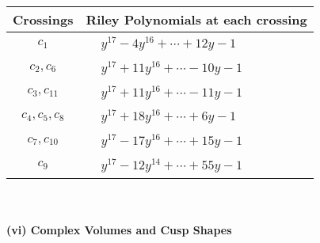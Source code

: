 \documentclass[1p]{elsarticle_modified}
\theoremstyle{definition}
\begin{document}
\begin{tabular}{m{50pt}|m{274pt}}
Crossings & \hspace{64pt}Riley Polynomials at each crossing \\
\hline $$\begin{aligned}c_{1}\end{aligned}$$&$\begin{aligned}
&y^{17}-4 y^{16}+\cdots+12 y-1
\end{aligned}$\\
\hline $$\begin{aligned}c_{2},c_{6}\end{aligned}$$&$\begin{aligned}
&y^{17}+11 y^{16}+\cdots-10 y-1
\end{aligned}$\\
\hline $$\begin{aligned}c_{3},c_{11}\end{aligned}$$&$\begin{aligned}
&y^{17}+11 y^{16}+\cdots-11 y-1
\end{aligned}$\\
\hline $$\begin{aligned}c_{4},c_{5},c_{8}\end{aligned}$$&$\begin{aligned}
&y^{17}+18 y^{16}+\cdots+6 y-1
\end{aligned}$\\
\hline $$\begin{aligned}c_{7},c_{10}\end{aligned}$$&$\begin{aligned}
&y^{17}-17 y^{16}+\cdots+15 y-1
\end{aligned}$\\
\hline $$\begin{aligned}c_{9}\end{aligned}$$&$\begin{aligned}
&y^{17}-12 y^{14}+\cdots+55 y-1
\end{aligned}$\\
\hline
\end{tabular}\\~\\
\newpage\flushleft \textbf{(vi) Complex Volumes and Cusp Shapes}
\end{document}
